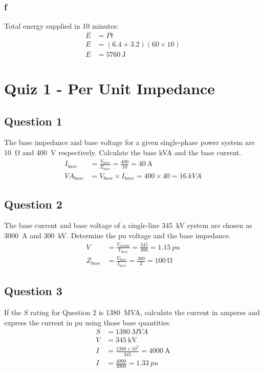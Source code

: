 \subsection{f}
Total energy supplied in 10 minutes:
\begin{align}
    E &= Pt\\
    E &= \left(6.4+3.2\right)\left(60\times 10\right)\\
    E &= \SI{5760}{\joule}
\end{align}
\chapter{Quiz 1 - Per Unit Impedance}
\section{Question 1}
The base impedance and base voltage for a given single-phase power system are \SI{10}{\ohm} and \SI{400}{\volt} respectively. Calculate the base kVA and the base current.
\begin{align}
    I_{base} &= \frac{V_{base}}{Z_{base}} = \frac{400}{10} = \SI{40}{\ampere}\\
    VA_{base} &= V_{base}\times I_{base} = 400\times 40 = \SI{16}{kVA}
\end{align}
\section{Question 2}
The base current and base voltage of a single-line \SI{345}{\kilo\volt} system are chosen as \SI{3000}{\ampere} and \SI{300}{\kilo\volt}. Determine the pu voltage and the base impedance.
\begin{align}
    V &= \frac{V_{actual}}{V_{base}} = \frac{345}{300} = \SI{1.15}{pu}\\
    Z_{base} &= \frac{V_{base}}{I_{base}} = \frac{300}{3} = \SI{100}{\ohm}
\end{align}
\section{Question 3}
If the $S$ rating for Question 2 is \SI{1380}{MVA}, calculate the current in amperes and express the current in pu using those base quantities.
\begin{align}
    S &= \SI{1380}{MVA}\\
    V &= \SI{345}{\kilo\volt}\\
    I &= \frac{1380\times 10^3}{345} = \SI{4000}{\ampere}\\
    I &= \frac{4000}{3000} = \SI{1.33}{pu}
\end{align}
